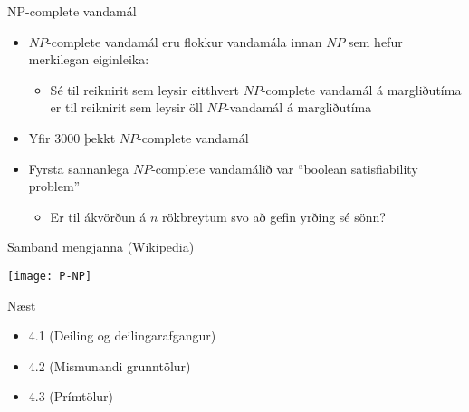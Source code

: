 \documentclass[handout]{beamer}
\begin{document}
\begin{frame}{NP-complete vandamál}
\begin{itemize}
 \item $NP$-complete vandamál eru flokkur vandamála innan $NP$ sem hefur merkilegan eiginleika:
 \begin{itemize}
  \item Sé til reiknirit sem leysir eitthvert $NP$-complete vandamál á margliðutíma er til reiknirit sem leysir öll $NP$-vandamál á margliðutíma
 \end{itemize}
 \item Yfir 3000 þekkt $NP$-complete vandamál
 \item Fyrsta sannanlega $NP$-complete vandamálið var ``boolean satisfiability problem''
 \begin{itemize}
  \item Er til ákvörðun á $n$ rökbreytum svo að gefin yrðing sé sönn?
 \end{itemize}
\end{itemize}
\end{frame}

\begin{frame}{Samband mengjanna (Wikipedia)}
\begin{center}
\texttt{[image: P-NP]}
\end{center}
\end{frame}


\begin{frame}{Næst}
\begin{itemize}
 \item 4.1 (Deiling og deilingarafgangur)
 \item 4.2 (Mismunandi grunntölur)
 \item 4.3 (Prímtölur)
\end{itemize}

\end{frame}
\end{document}
